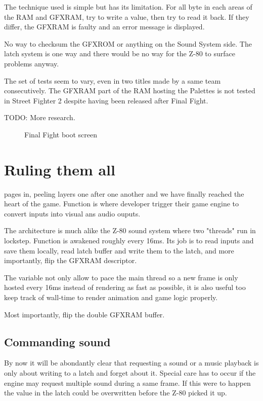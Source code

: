 \pagebreak


The technique used is simple but has its limitation. For all byte in each areas of the RAM and GFXRAM, try to write a value, then try to read it back. If they differ, the GFXRAM is faulty and an error message is displayed. 

No way to checksum the GFXROM or anything on the Sound System side. The latch system is one way and there would be no way for the Z-80 to surface problems anyway.


The set of tests seem to vary, even in two titles made by a same team consecutively. The GFXRAM part of the RAM hosting the Palettes is not tested in Street Fighter 2 despite having been released after Final Fight.

TODO: More research.

\vfill
\begin{figure}[H]
\caption*{Final Fight boot screen}
\end{figure}


\pagebreak

\section{Ruling them all}
\label{this}
\pageref{this} pages in, peeling layers one after one another and we have finally reached the heart of the game. Function  is where developer trigger their game engine to convert inputs into visual ans audio ouputs.

The architecture is much alike the Z-80 sound system where two "threads" run in lockstep. Function  is awakened roughly every 16ms. Its job is to read inputs and save them locally, read latch buffer and write them to the latch, and more importantly, flip the GFXRAM descriptor. 

\begin{trivia}
The  variable not only allow to pace the main thread so a new frame is only hosted every 16ms instead of rendering as fast as possible, it is also useful too keep track of wall-time to render animation and game logic properly.
\end{trivia}

Most importantly, flip the double GFXRAM buffer.

\subsection{Commanding sound}
By now it will be abondantly clear that requesting a sound or a music playback is only about writing to a latch and forget about it. Special care has to occur if the engine may request multiple sound during a same frame. If this were to happen the value in the latch could be overwritten before the Z-80 picked it up.

